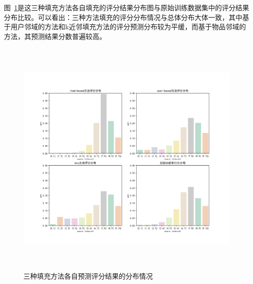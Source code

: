     图~\ref{fig: pred_score_distribution}是这三种填充方法各自填充的评分结果分布图与原始训练数据集中的评分结果分布比较。可以看出：三种方法填充的评分分布情况与总体分布大体一致，其中基于用户邻域的方法和k近邻填充方法的评分预测分布较为平缓，而基于物品邻域的方法，其预测结果分数普遍较高。
    \begin{figure}[htbp]
      \centering
      \includegraphics[height=12.0cm,width=16.0cm]{figure/pred_score.png}
      \caption{三种填充方法各自预测评分结果的分布情况}
      \label{fig: pred_score_distribution}
    \end{figure}

